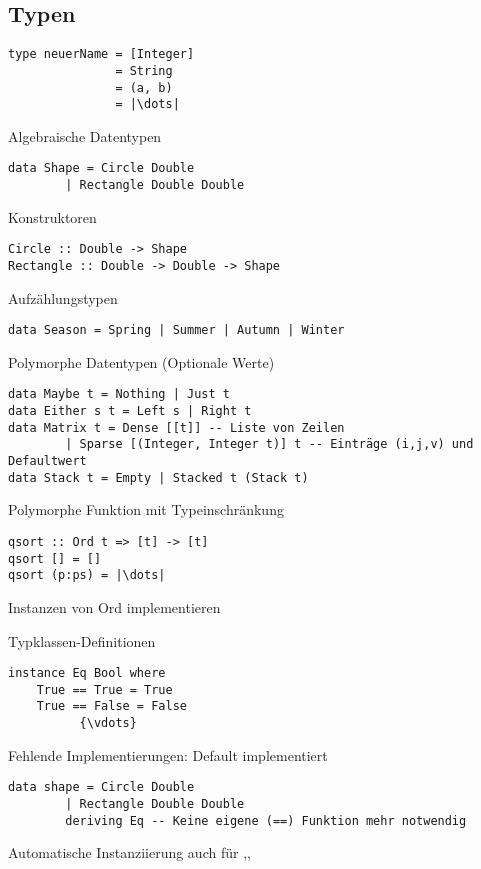 \documentclass{Zusammenfassung}
\begin{document}
\subsection{Typen}\label{subsec:typen}
\begin{verbatim}
type neuerName = [Integer]
               = String
               = (a, b)
               = |\dots|
\end{verbatim}
\begin{multicols}{2}
Algebraische Datentypen
\begin{verbatim}
data Shape = Circle Double
        | Rectangle Double Double
\end{verbatim}
\columnbreak
Konstruktoren
\begin{verbatim}
Circle :: Double -> Shape
Rectangle :: Double -> Double -> Shape
\end{verbatim}
\end{multicols}
Aufzählungstypen
\begin{verbatim}
data Season = Spring | Summer | Autumn | Winter
\end{verbatim}
Polymorphe Datentypen (Optionale Werte)
\begin{verbatim}
data Maybe t = Nothing | Just t
data Either s t = Left s | Right t
data Matrix t = Dense [[t]] -- Liste von Zeilen
        | Sparse [(Integer, Integer t)] t -- Einträge (i,j,v) und Defaultwert
data Stack t = Empty | Stacked t (Stack t)
\end{verbatim}
Polymorphe Funktion mit Typeinschränkung
\begin{multicols}{2}
\begin{verbatim}
qsort :: Ord t => [t] -> [t]
qsort [] = []
qsort (p:ps) = |\dots|
\end{verbatim}
\columnbreak
Instanzen von Ord implementieren 
\end{multicols}
\begin{multicols}{2}
Typklassen-Definitionen
\begin{verbatim}
instance Eq Bool where
    True == True = True
    True == False = False
          {\vdots}
    \end{verbatim}
    \columnbreak
    Fehlende Implementierungen: Default implementiert
\end{multicols}
\begin{verbatim}
data shape = Circle Double
        | Rectangle Double Double
        deriving Eq -- Keine eigene (==) Funktion mehr notwendig
\end{verbatim}
Automatische Instanziierung auch für ,,
\end{document}
